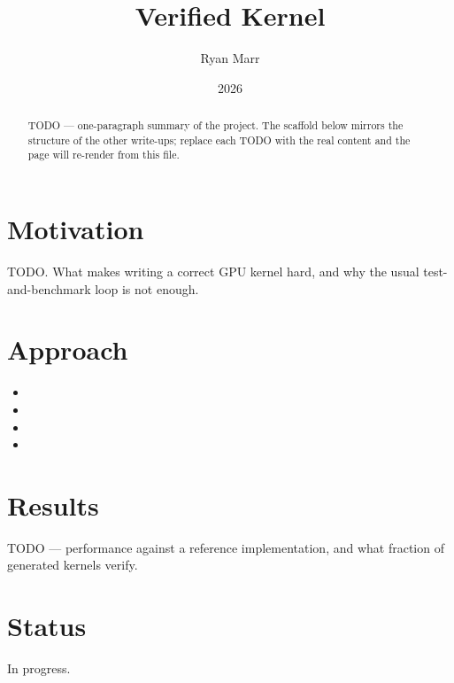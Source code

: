 \documentclass{article}
\title{Verified Kernel}
\author{Ryan Marr}
\date{2026}
\begin{document}
\maketitle

\begin{abstract}
TODO --- one-paragraph summary of the project. The scaffold below mirrors the
structure of the other write-ups; replace each TODO with the real content and the
page will re-render from this file.
\end{abstract}

\section{Motivation}

TODO. What makes writing a correct GPU kernel hard, and why the usual
test-and-benchmark loop is not enough.

\section{Approach}

\begin{itemize}
  \item {}

  \item {}

  \item {}

  \item {}
\end{itemize}

\section{Results}

TODO --- performance against a reference implementation, and what fraction of
generated kernels verify.

\section{Status}

In progress.
\end{document}
